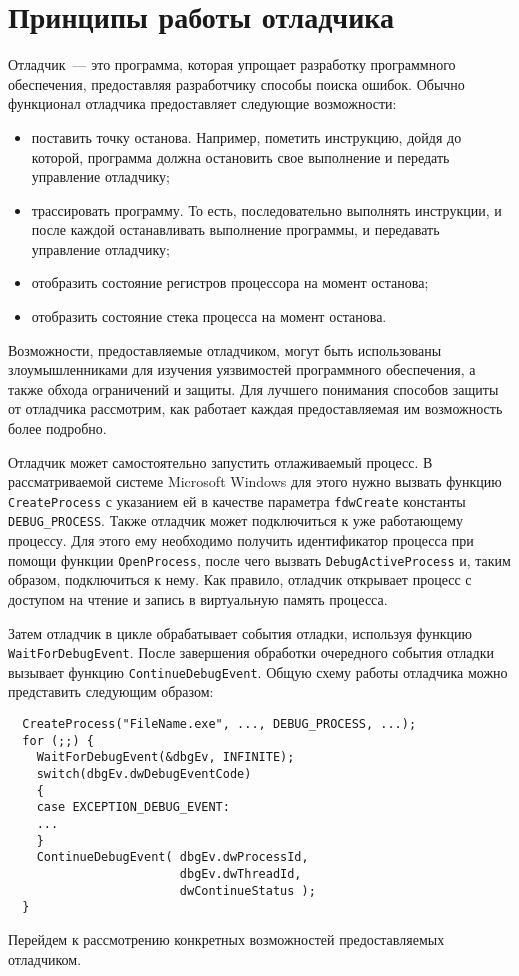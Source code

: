 \section{Принципы работы отладчика}
Отладчик~--- это программа, которая упрощает разработку программного
обеспечения, предоставляя разработчику способы поиска ошибок. Обычно функционал
отладчика предоставляет следующие возможности:
\begin{itemize}
  \item поставить точку останова. Например, пометить инструкцию, дойдя до
    которой, программа должна остановить свое выполнение и передать управление
    отладчику;
  \item трассировать программу. То есть, последовательно выполнять инструкции, и
    после каждой останавливать выполнение программы, и передавать управление
    отладчику;
  \item отобразить состояние регистров процессора на момент останова;
  \item отобразить состояние стека процесса на момент останова.
\end{itemize}

Возможности, предоставляемые отладчиком, могут быть использованы
злоумышленниками для изучения уязвимостей программного обеспечения, а также
обхода ограничений и защиты.  Для лучшего понимания способов защиты от отладчика
рассмотрим, как работает каждая предоставляемая им возможность более
подробно.

Отладчик может самостоятельно запустить отлаживаемый процесс. В рассматриваемой
системе Microsoft Windows для этого нужно вызвать функцию \verb!CreateProcess!
с указанием ей в качестве параметра \verb!fdwCreate! константы
\verb!DEBUG_PROCESS!. Также отладчик может подключиться к уже работающему
процессу. Для этого ему необходимо получить идентификатор процесса при помощи
функции \verb!OpenProcess!, после чего вызвать \verb!DebugActiveProcess! и, таким
образом, подключиться к нему.  Как правило, отладчик открывает процесс с доступом
на чтение и запись в виртуальную память процесса.

Затем отладчик в цикле обрабатывает события отладки, используя функцию
\verb!WaitForDebugEvent!. После завершения обработки очередного события отладки
вызывает функцию \verb!ContinueDebugEvent!. Общую схему работы отладчика можно
представить следующим образом:
\begin{verbatim}
  CreateProcess("FileName.exe", ..., DEBUG_PROCESS, ...); 
  for (;;) {
    WaitForDebugEvent(&dbgEv, INFINITE);
    switch(dbgEv.dwDebugEventCode) 
    {
    case EXCEPTION_DEBUG_EVENT:
    ...
    }
    ContinueDebugEvent( dbgEv.dwProcessId,
                        dbgEv.dwThreadId,
                        dwContinueStatus );
  }
\end{verbatim}

Перейдем к рассмотрению конкретных возможностей предоставляемых отладчиком.
